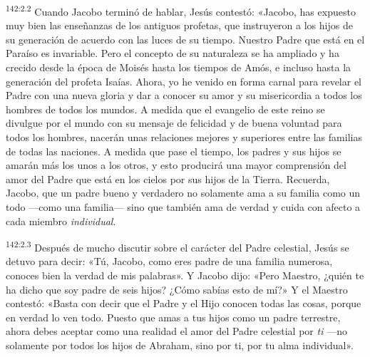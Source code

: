 \par
\textsuperscript{142:2.2} Cuando Jacobo terminó de hablar, Jesús contestó: «Jacobo, has expuesto muy bien las enseñanzas de los antiguos profetas, que instruyeron a los hijos de su generación de acuerdo con las luces de su tiempo. Nuestro Padre que está en el Paraíso es invariable. Pero el concepto de su naturaleza se ha ampliado y ha crecido desde la época de Moisés hasta los tiempos de Amós, e incluso hasta la generación del profeta Isaías. Ahora, yo he venido en forma carnal para revelar el Padre con una nueva gloria y dar a conocer su amor y su misericordia a todos los hombres de todos los mundos. A medida que el evangelio de este reino se divulgue por el mundo con su mensaje de felicidad y de buena voluntad para todos los hombres, nacerán unas relaciones mejores y superiores entre las familias de todas las naciones. A medida que pase el tiempo, los padres y sus hijos se amarán más los unos a los otros, y esto producirá una mayor comprensión del amor del Padre que está en los cielos por sus hijos de la Tierra. Recuerda, Jacobo, que un padre bueno y verdadero no solamente ama a su familia como un todo ---como una familia--- sino que también ama de verdad y cuida con afecto a cada miembro \textit{individual}.

\par
\textsuperscript{142:2.3} Después de mucho discutir sobre el carácter del Padre celestial, Jesús se detuvo para decir: «Tú, Jacobo, como eres padre de una familia numerosa, conoces bien la verdad de mis palabras». Y Jacobo dijo: «Pero Maestro, ¿quién te ha dicho que soy padre de seis hijos? ¿Cómo sabías esto de mí?» Y el Maestro contestó: «Basta con decir que el Padre y el Hijo conocen todas las cosas, porque en verdad lo ven todo. Puesto que amas a tus hijos como un padre terrestre, ahora debes aceptar como una realidad el amor del Padre celestial por \textit{ti} ---no solamente por todos los hijos de Abraham, sino por ti, por tu alma individual».

